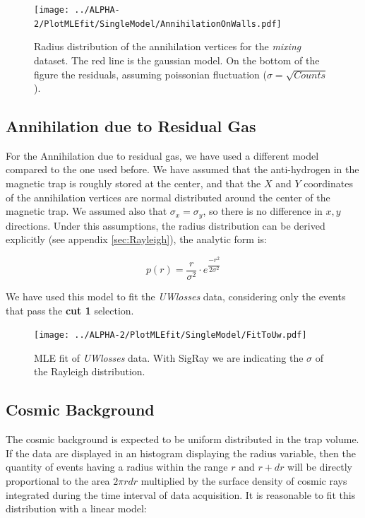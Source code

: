 \documentclass[11pt,a4paper,oneside]{article}
\begin{document}
\begin{figure}[hbtp]
\texttt{[image: ../ALPHA-2/PlotMLEfit/SingleModel/AnnihilationOnWalls.pdf]}
\caption{Radius distribution of the annihilation vertices for the \textit{mixing} dataset. The red line is the gaussian model. On the bottom of the figure the residuals, assuming poissonian fluctuation ($\sigma = \sqrt{Counts}$).}
\label{fig:MixingFit}
\end{figure}

\subsection*{Annihilation due to Residual Gas}

For the Annihilation due to residual gas, we have used a different model compared to the one used before. We have assumed that the anti-hydrogen in the magnetic trap is roughly stored at the center, and that the $X$ and $Y$ coordinates of the annihilation vertices are normal distributed around the center of the magnetic trap. We assumed also that $\sigma_{x} = \sigma_{y}$, so there is no difference in $x,y$ directions. Under this assumptions, the radius distribution can be derived explicitly (see appendix \ref{sec:Rayleigh}), the analytic form is:

\begin{equation}
p(r) = \frac{r}{\sigma^{2}} \cdot  e^{ \dfrac{- r^{2}}{ 2 \sigma^{2}}}
\end{equation}

We have used this model to fit the \textit{UWlosses} data, considering only the events that pass the \textbf{cut 1} selection.
\begin{figure}[hbtp]

\centering
\texttt{[image: ../ALPHA-2/PlotMLEfit/SingleModel/FitToUw.pdf]}
\caption{ MLE fit of \textit{UWlosses} data. With SigRay we are indicating the $\sigma$ of the Rayleigh distribution.}
\end{figure}

\subsection*{Cosmic Background}

The cosmic background is expected to be uniform distributed in the trap volume. If the data are displayed in an histogram displaying the radius variable, then the quantity of events having a radius within the range $r$ and $r + dr$ will be directly proportional to the area $ 2 \pi r dr$ multiplied by the surface density of cosmic rays integrated during the time interval of data acquisition. It is reasonable to fit this distribution with a linear model:
\end{document}
